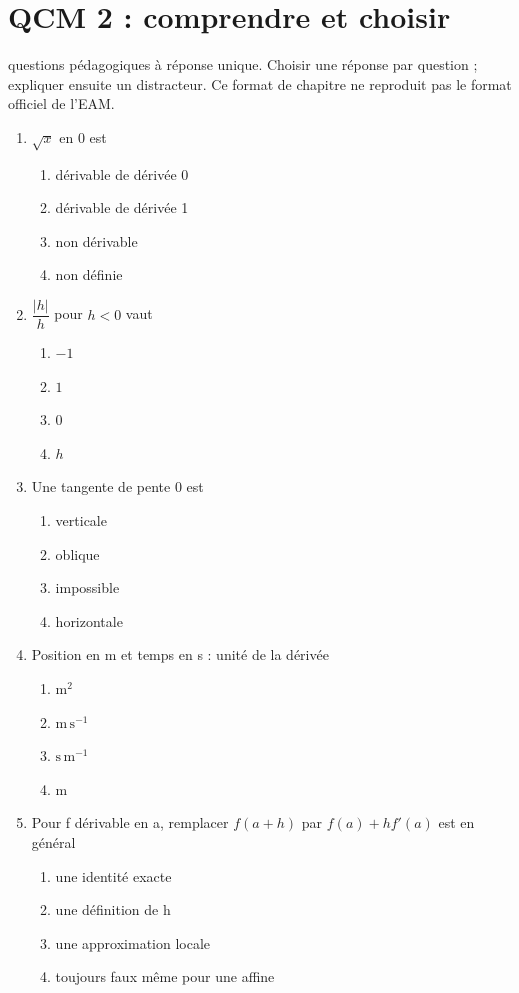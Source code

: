 \endgroup
\begingroup\small
{}\section*{QCM 2 : comprendre et choisir}\label{C04-Q2}
 questions pédagogiques à réponse unique. Choisir une réponse par question ; expliquer ensuite un distracteur. Ce format de chapitre ne reproduit pas le format officiel de l’EAM.
\begin{enumerate}
\item $\sqrt{x}$ en 0 est
\begin{enumerate}[label=\Alph*.,itemsep=2pt]
\item dérivable de dérivée 0
\item dérivable de dérivée 1
\item non dérivable
\item non définie
\end{enumerate}
\item $\dfrac{|h|}{h}$ pour $h<0$ vaut
\begin{enumerate}[label=\Alph*.,itemsep=2pt]
\item $-1$
\item $1$
\item $0$
\item $h$
\end{enumerate}
\item Une tangente de pente 0 est
\begin{enumerate}[label=\Alph*.,itemsep=2pt]
\item verticale
\item oblique
\item impossible
\item horizontale
\end{enumerate}
\item Position en m et temps en s : unité de la dérivée
\begin{enumerate}[label=\Alph*.,itemsep=2pt]
\item $\mathrm{m^2}$
\item $\mathrm{m\,s^{-1}}$
\item $\mathrm{s\,m^{-1}}$
\item $\mathrm{m}$
\end{enumerate}
\item Pour f dérivable en a, remplacer $f(a+h)$ par $f(a)+hf\prime(a)$ est en général
\begin{enumerate}[label=\Alph*.,itemsep=2pt]
\item une identité exacte
\item une définition de h
\item une approximation locale
\item toujours faux même pour une affine
\end{enumerate}
\end{enumerate}
